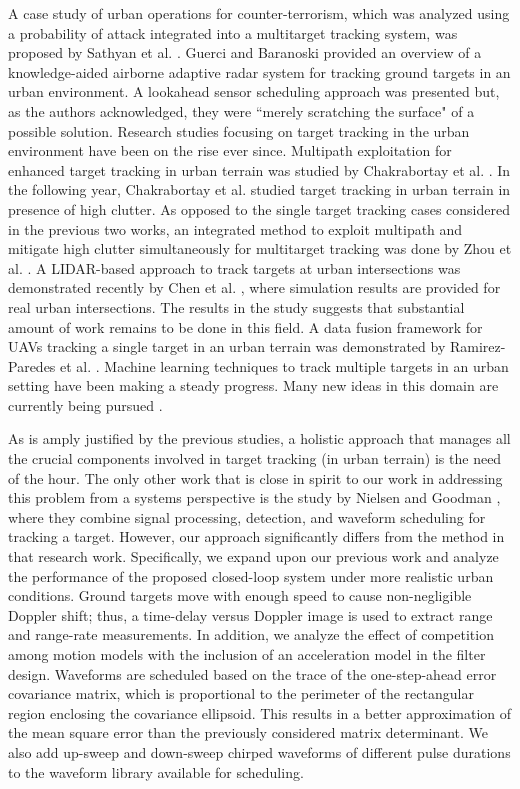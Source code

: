 \documentclass[times]{asjcauth}
\begin{document}
A case study of urban operations for counter-terrorism, which was analyzed using a probability of attack integrated into a multitarget tracking system, was proposed by Sathyan et al. \cite{terrorism}. Guerci and Baranoski \cite{Baranoski} provided an overview of a knowledge-aided airborne adaptive radar system for tracking ground targets in an urban environment. A lookahead sensor scheduling approach was presented but, as the authors acknowledged, they were ``merely scratching the surface" of a possible solution. Research studies focusing on target tracking in the urban environment have been on the rise ever since. Multipath exploitation for enhanced target tracking in urban terrain was studied by Chakrabortay et al. \cite{chak1}. In the following year, Chakrabortay et al. \cite{chak2} studied target tracking in urban terrain in presence of high clutter. As opposed to the single target tracking cases considered in the previous two works, an integrated method to exploit multipath and mitigate high clutter simultaneously for multitarget tracking was done by Zhou et al. \cite{zhou}. A LIDAR-based approach to track targets at urban intersections was demonstrated recently by Chen et al. \cite{chen18}, where simulation results are provided for real urban intersections. The results in the study suggests that substantial amount of work remains to be done in this field. A data fusion framework for UAVs tracking a single target in an urban terrain was demonstrated by Ramirez-Paredes et al. \cite{data}. Machine learning techniques to track multiple targets in an urban setting have been making a steady progress. Many new ideas in this domain are currently being pursued \cite{machine}.

As is amply justified by the previous studies, a holistic approach that manages all the crucial components involved in target tracking (in urban terrain) is the need of the hour. The only other work that is close in spirit to our work in addressing this problem from a systems perspective is the study by Nielsen and Goodman \cite{complete}, where they combine signal processing, detection, and waveform scheduling for tracking a target. However, our approach significantly differs from the method in that research work. Specifically, we expand upon our previous work \cite{mypaper} and analyze the performance of the proposed closed-loop system under more realistic urban conditions. Ground targets move with enough speed to cause non-negligible Doppler shift; thus, a time-delay versus Doppler image is used to extract range and range-rate measurements. In addition, we analyze the effect of competition among motion models with the inclusion of an acceleration model in the filter design. Waveforms are scheduled based on the trace of the one-step-ahead error covariance matrix, which is proportional to the perimeter of the rectangular region enclosing the covariance ellipsoid. This results in a better approximation of the mean square error than the previously considered matrix determinant. We also add up-sweep and down-sweep chirped waveforms of different pulse durations to the waveform library available for scheduling.
\end{document}
